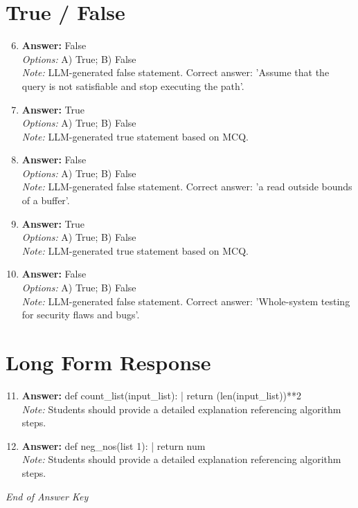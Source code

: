 \documentclass[12pt]{article}
\begin{document}
\section*{True / False}
\begin{enumerate}[label=\arabic*.]
\setcounter{enumi}{5}
\item \textbf{Answer:} False
\\ \textit{Options:} A) True; B) False
\\ \textit{Note:} LLM-generated false statement. Correct answer: 'Assume that the query is not satisfiable and stop executing the path'.
\item \textbf{Answer:} True
\\ \textit{Options:} A) True; B) False
\\ \textit{Note:} LLM-generated true statement based on MCQ.
\item \textbf{Answer:} False
\\ \textit{Options:} A) True; B) False
\\ \textit{Note:} LLM-generated false statement. Correct answer: 'a read outside bounds of a buffer'.
\item \textbf{Answer:} True
\\ \textit{Options:} A) True; B) False
\\ \textit{Note:} LLM-generated true statement based on MCQ.
\item \textbf{Answer:} False
\\ \textit{Options:} A) True; B) False
\\ \textit{Note:} LLM-generated false statement. Correct answer: 'Whole-system testing for security flaws and bugs'.
\end{enumerate}

\section*{Long Form Response}
\begin{enumerate}[label=\arabic*.]
\setcounter{enumi}{10}
\item \textbf{Answer:} def count\_list(input\_list): | return (len(input\_list))**2
\\ \textit{Note:} Students should provide a detailed explanation referencing algorithm steps.
\item \textbf{Answer:} def neg\_nos(list 1): | return num
\\ \textit{Note:} Students should provide a detailed explanation referencing algorithm steps.
\end{enumerate}

\vfill
\noindent\textit{End of Answer Key}
\end{document}
